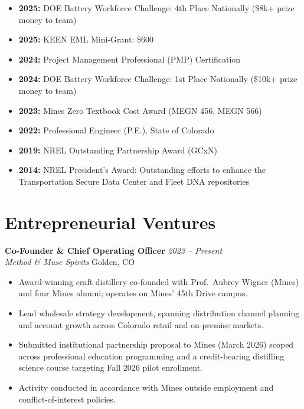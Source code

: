 \documentclass[11pt,letterpaper]{article}
\newcommand{\cventry}[4]{%
  \noindent\textbf{#1} \hfill \textit{#2}\\
  \textit{#3} \hfill #4\vspace{3pt}}
\begin{document}
\begin{itemize}[noitemsep]
  \item \textbf{2025:} DOE Battery Workforce Challenge: 4th Place Nationally
        (\$8k+ prize money to team)
  \item \textbf{2025:} KEEN EML Mini-Grant: \$600
  \item \textbf{2024:} Project Management Professional (PMP) Certification
  \item \textbf{2024:} DOE Battery Workforce Challenge: 1st Place Nationally
        (\$10k+ prize money to team)
  \item \textbf{2023:} Mines Zero Textbook Cost Award (MEGN 456, MEGN 566)
  \item \textbf{2022:} Professional Engineer (P.E.), State of Colorado
  \item \textbf{2019:} NREL Outstanding Partnership Award (GCxN)
  \item \textbf{2014:} NREL President's Award: Outstanding efforts to enhance the
        Transportation Secure Data Center and Fleet DNA repositories
\end{itemize}

\section{Entrepreneurial Ventures}

\cventry{Co-Founder \& Chief Operating Officer}{2023 -- Present}{Method \& Muse Spirits}{Golden, CO}
\begin{itemize}
  \item Award-winning craft distillery co-founded with Prof.\ Aubrey Wigner (Mines)
        and four Mines alumni; operates on Mines' 45th Drive campus.
  \item Lead wholesale strategy development, spanning distribution channel planning
        and account growth across Colorado retail and on-premise markets.
  \item Submitted institutional partnership proposal to Mines (March 2026) scoped
        across professional education programming and a credit-bearing distilling
        science course targeting Fall 2026 pilot enrollment.
  \item Activity conducted in accordance with Mines outside employment and
        conflict-of-interest policies.
\end{itemize}

\end{document}
